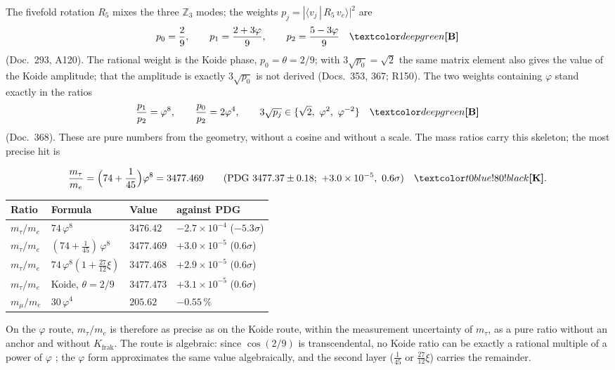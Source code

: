 The fivefold rotation $R_5$ mixes the three
$\mathbb Z_3$ modes; the weights $p_j=|\langle v_j\,|\,R_5\,v_e\rangle|^2$ are
\begin{equation}
  p_0=\frac29,\qquad p_1=\frac{2+3\varphi}{9},\qquad p_2=\frac{5-3\varphi}{9}\quad\BM
\end{equation}
(Doc.~293, A120). The rational weight is the Koide phase, $p_0=\theta=2/9$; with
$3\sqrt{p_0}=\sqrt2$ the same matrix element also gives the value of the Koide amplitude; that
the amplitude is exactly $3\sqrt{p_0}$ is not derived \SM{} (Docs.~353, 367; R150). The two
weights containing $\varphi$ stand exactly in the ratios
\begin{equation}
  \frac{p_1}{p_2}=\varphi^8,\qquad \frac{p_0}{p_2}=2\varphi^4,\qquad
  3\sqrt{p_j}\in\{\sqrt2,\ \varphi^2,\ \varphi^{-2}\}\quad\BM
\end{equation}
(Doc.~368). These are pure numbers from the geometry, without a cosine and without a scale. The
mass ratios carry this skeleton; the most precise hit is
\begin{ffkern}
\begin{equation}
  \frac{m_\tau}{m_e}=\Bigl(74+\frac1{45}\Bigr)\varphi^8=3477.469\qquad
  (\text{PDG }3477.37\pm0.18;\ +3.0\times10^{-5},\ 0.6\sigma)\quad\KM .
\end{equation}
\end{ffkern}%
\begin{center}
\small
\begin{tabular}{@{}llll@{}}
\toprule
\textbf{Ratio} & \textbf{Formula} & \textbf{Value} & \textbf{against PDG} \\
\midrule
$m_\tau/m_e$ & $74\,\varphi^8$ & $3476.42$ & $-2.7\times10^{-4}$ ($-5.3\sigma$) \\
$m_\tau/m_e$ & $(74+\tfrac1{45})\,\varphi^8$ & $3477.469$ & $+3.0\times10^{-5}$ ($0.6\sigma$) \\
$m_\tau/m_e$ & $74\,\varphi^8(1+\tfrac{27}{12}\xi)$ & $3477.468$ & $+2.9\times10^{-5}$ ($0.6\sigma$) \\
$m_\tau/m_e$ & Koide, $\theta=2/9$ & $3477.473$ & $+3.1\times10^{-5}$ ($0.6\sigma$) \\
$m_\mu/m_e$ & $30\,\varphi^4$ & $205.62$ & $-0.55\,\%$ \\
\bottomrule
\end{tabular}
\end{center}

On the $\varphi$ route, $m_\tau/m_e$ is therefore as precise as on the Koide route, within the
measurement uncertainty of $m_\tau$, as a pure ratio without an anchor and without
$K_{\text{frak}}$. The route is algebraic: since $\cos(2/9)$ is transcendental, no Koide ratio
can be exactly a rational multiple of a power of $\varphi$ \BM; the $\varphi$ form approximates
the same value algebraically, and the second layer ($\tfrac1{45}$ or $\tfrac{27}{12}\xi$) carries
the remainder.

